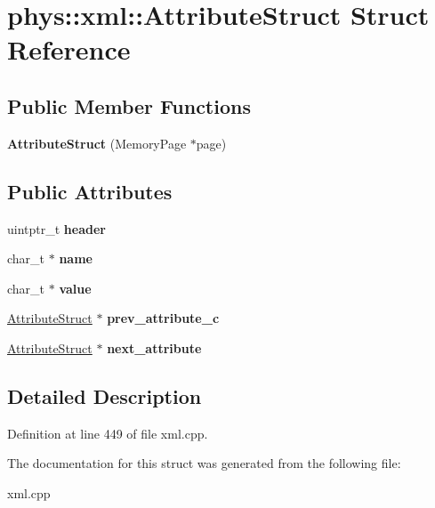 \hypertarget{structphys_1_1xml_1_1AttributeStruct}{
\section{phys::xml::AttributeStruct Struct Reference}
\label{dd/dfe/structphys_1_1xml_1_1AttributeStruct}
}
\subsection*{Public Member Functions}
\begin{DoxyCompactItemize}
\item 
\hypertarget{structphys_1_1xml_1_1AttributeStruct_ae56b37b04de2de9b06f2ab62063860d0}{
{\bfseries AttributeStruct} (MemoryPage $\ast$page)}
\label{dd/dfe/structphys_1_1xml_1_1AttributeStruct_ae56b37b04de2de9b06f2ab62063860d0}

\end{DoxyCompactItemize}
\subsection*{Public Attributes}
\begin{DoxyCompactItemize}
\item 
\hypertarget{structphys_1_1xml_1_1AttributeStruct_a9fd6577532fd75614cbbeef25ebc483d}{
uintptr\_\-t {\bfseries header}}
\label{dd/dfe/structphys_1_1xml_1_1AttributeStruct_a9fd6577532fd75614cbbeef25ebc483d}

\item 
\hypertarget{structphys_1_1xml_1_1AttributeStruct_a4063a57165ab503f269e785f2606afbf}{
char\_\-t $\ast$ {\bfseries name}}
\label{dd/dfe/structphys_1_1xml_1_1AttributeStruct_a4063a57165ab503f269e785f2606afbf}

\item 
\hypertarget{structphys_1_1xml_1_1AttributeStruct_a4ef17ff97e13877dd8cf22eac20b3e08}{
char\_\-t $\ast$ {\bfseries value}}
\label{dd/dfe/structphys_1_1xml_1_1AttributeStruct_a4ef17ff97e13877dd8cf22eac20b3e08}

\item 
\hypertarget{structphys_1_1xml_1_1AttributeStruct_ad37be3bf8c8d5a469396e882af402f89}{
\hyperlink{structphys_1_1xml_1_1AttributeStruct}{AttributeStruct} $\ast$ {\bfseries prev\_\-attribute\_\-c}}
\label{dd/dfe/structphys_1_1xml_1_1AttributeStruct_ad37be3bf8c8d5a469396e882af402f89}

\item 
\hypertarget{structphys_1_1xml_1_1AttributeStruct_a647e4114bd818b0f88acff5c18746b0f}{
\hyperlink{structphys_1_1xml_1_1AttributeStruct}{AttributeStruct} $\ast$ {\bfseries next\_\-attribute}}
\label{dd/dfe/structphys_1_1xml_1_1AttributeStruct_a647e4114bd818b0f88acff5c18746b0f}

\end{DoxyCompactItemize}


\subsection{Detailed Description}


Definition at line 449 of file xml.cpp.



The documentation for this struct was generated from the following file:\begin{DoxyCompactItemize}
\item 
xml.cpp\end{DoxyCompactItemize}
